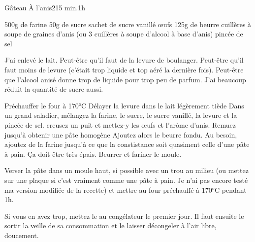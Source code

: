 \begin{recette}{Gâteau À l'anis}{2}{15 min.}{1h}
\begin{ingredients}
\ingredient 500g de farine
\ingredient 50g de sucre
 sachet de sucre vanillé
 œufs
\ingredient 125g de beurre
 cuillères à soupe de graines d’anis (ou 3 cuillères à soupe d'alcool à base d'anis)
 pincée de sel
\end{ingredients}
\begin{remarque}
J'ai enlevé le lait. Peut-être qu'il faut de la levure de boulanger. Peut-être qu'il faut moins de levure (c'était trop liquide et top aéré la dernière fois). Peut-être que l'alcool anisé donne trop de liquide pour trop peu de parfum. J'ai beaucoup réduit la quantité de sucre aussi.
\end{remarque}


\begin{preparation}
\etape Préchauffer le four à 170°C
\etape Délayer la levure dans le lait légèrement tiède
\etape Dans un grand saladier, mélangez la farine, le sucre, le sucre vanillé, la levure et la pincée de sel.
\etape creusez un puit et mettez-y les œufs et l'arôme d'anis. Remuez jusqu'à obtenir une pâte homogène
\etape Ajoutez alors le beurre fondu. 
\etape Au besoin, ajoutez de la farine jusqu'à ce que la constistance soit quasiment celle d'une pâte à pain. Ça doit être très épais.
\etape Beurrer et fariner le moule.
\end{preparation}

\begin{cuisson}
Verser la pâte dans un moule haut, si possible avec un trou au milieu (ou mettez sur une plaque si c'est vraiment comme une pâte à pain. Je n'ai pas encore testé ma version modifiée de la recette) et mettre au four préchauffé à 170°C pendant 1h. 
\end{cuisson}
\begin{remarque}
Si vous en avez trop, mettez le au congélateur le premier jour. Il faut ensuite le sortir la veille de sa consommation et le laisser décongeler à l'air libre, doucement. 
\end{remarque}

\end{recette}

